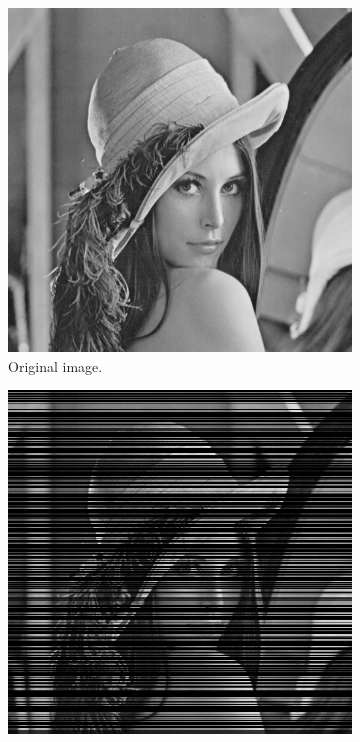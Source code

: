 \documentclass[abstracton]{scrreprt}
\begin{document}
        \begin{figure}[!ht]
            \centering
            \begin{subfigure}[b]{0.30\textwidth}
                \includegraphics[width=\textwidth]{img/images/lena.png}
                \caption{Original image.}
            \end{subfigure}
            \begin{subfigure}[b]{0.30\textwidth}
                \includegraphics[width=\textwidth]{img/images/lena_inpaint.png}

\end{subfigure}
\end{figure}
\end{document}

